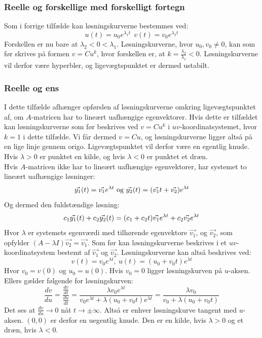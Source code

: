 \subsubsection{Reelle og forskellige med forskelligt fortegn}
Som i forrige tilfælde kan løsningskurverne bestemmes ved:
\begin{equation*}
    u(t)=u_0e^{\lambda_1 t} \ \  v(t)=v_0e^{\lambda_2 t}
\end{equation*}
Forskellen er nu bare at $\lambda_2<0<\lambda_1$. Løsningskurverne, hvor $u_0,v_0 \neq 0$, kan som før skrives på formen $v=Cu^k$, hvor forskellen er, at $k=\frac{\lambda_2}{\lambda_1}<0$. Løsningskurverne vil derfor være hyperbler, og ligevægtspunktet er dermed ustabilt.
\subsubsection{Reelle og ens}
I dette tilfælde afhænger opførslen af løsningskurverne omkring ligevægtspunktet af, om $A$-matricen har to lineært uafhængige egenvektorer. Hvis dette er tilfældet kan løsningskurverne som før beskrives ved $v=Cu^k$ i $uv$-koordinatsystemet, hvor $k=1$ i dette tilfælde. Vi får dermed $v=Cu$, og løsningskurverne ligger altså på en lige linje gennem origo. Ligevægtspunktet vil derfor være en egentlig knude. Hvis $\lambda>0$ er punktet en kilde, og hvis $\lambda<0$ er punktet et dræn. \\
Hvis $A$-matricen ikke har to lineært uafhængige egenvektorer, har systemet to lineært uafhængige løsninger:
\begin{equation*}
    \vec{y_1}(t)=\vec{v_1}e^{\lambda t} \ \textnormal{og} \ \vec{y_2}(t)=(\vec{v_1}t+\vec{v_2})e^{\lambda t}
\end{equation*}
Og dermed den fuldstændige løsning:
\begin{equation*}
    c_1\vec{y_1}(t)+c_2\vec{y_2}(t) = \\
    (c_1+c_2t)\vec{v_1}e^{\lambda t} +c_2\vec{v_2}e^{\lambda t}
\end{equation*}
Hvor $\lambda$ er systemets egenværdi med tilhørende egenvektore $\vec{v_1}$, og $\vec{v_2}$, som opfylder $(A-\lambda I)\vec{v_2}=\vec{v_1}$.
Som før kan løsningskurverne beskrives i et $uv$-koordinatsystem bestemt af $\vec{v_1}$ og $\vec{v_2}$. Løsningskurverne kan altså beskrives ved:
\begin{equation*}
    v(t)=v_0e^{\lambda t}, \ u(t)=(u_0+v_0t)e^{\lambda t}
\end{equation*}
Hvor $v_0=v(0)$ og $u_0=u(0)$. Hvis $v_0=0$ ligger løsningskurven på $u$-aksen. Ellers gælder følgende for løsningskurven:
\begin{equation*}
    \frac{dv}{du}=\frac{\frac{dv}{dt}}{\frac{du}{dt}}=\frac{\lambda v_0e^{\lambda t}}{v_0e^{\lambda t}+\lambda(u_0+v_0t)e^{\lambda t}}=\frac{\lambda v_0}{v_0+\lambda(u_0+v_0t)}
\end{equation*}
Det ses at $\frac{dv}{du} \to 0$ nåt $t \to \pm
\infty$. Altså er enhver løsningskurve tangent med $u$-aksen. $(0,0)$ er derfor en uegentlig knude. Den er en kilde, hvis $\lambda>0$ og et dræn, hvis $\lambda<0$.
